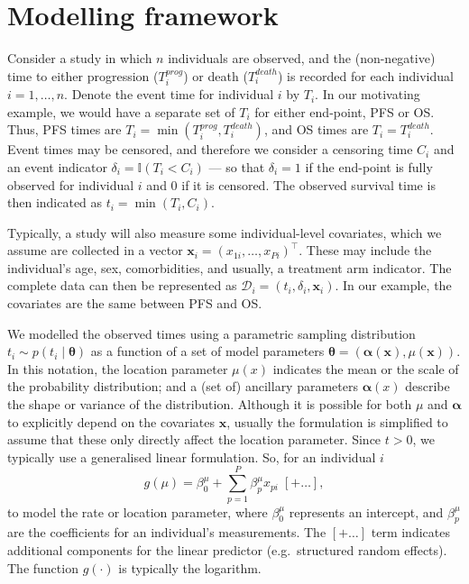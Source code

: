\documentclass[AMA,STIX1COL]{WileyNJD-v2}
\begin{document}
%
\section{Modelling framework}\label{sec:methods}
Consider a study in which $n$ individuals are observed, and the (non-negative) time to either progression ($T^{prog}_{i}$) or death ($T^{death}_{i}$) is recorded for each individual $i=1,\ldots,n$.
Denote the event time for individual $i$ by $T_{i}$.
In our motivating example, we would have a separate set of $T_{i}$ for either end-point, PFS or OS.
Thus, PFS times are $T_{i} = \min(T^{prog}_{i}, T^{death}_{i})$, and OS times are $T_{i} = T^{death}_{i}$.
Event times may be censored, and therefore we consider a censoring time $C_{i}$ and an event indicator $\delta_{i} = \mathbb{I}(T_{i} < C_{i})$
--- so that $\delta_{i} = 1$ if the end-point is fully observed for individual $i$ and 0 if it is censored.
The observed survival time is then indicated as $t_{i} = \min(T_{i}, C_{i})$.

Typically, a study will also measure some individual-level covariates, which we assume are collected in a vector $\bm{x}_{i} = (x_{1i}, \ldots, x_{Pi})^\top$.
These may include the individual's age, sex, comorbidities, and usually, a treatment arm indicator.
The complete data can then be represented as
$\mathcal{D}_i = (t_i, \delta_i, \bm{x}_i)$.
In our example, the covariates are the same between PFS and OS.

We modelled the observed times using a parametric sampling distribution $t_{i} \sim p(t_{i} \mid \bm\theta)$ as a function of a set of model parameters $\bm\theta = (\bm\alpha(\bm x), \mu(\bm x))$. 
In this notation, the location parameter $\mu(x)$ indicates the mean or the scale of the probability distribution; and a (set of) ancillary parameters $\bm \alpha(x)$ describe the shape or variance of the distribution.
Although it is possible for both $\mu$ and $\bm\alpha$ to explicitly depend on the covariates $\bm x$, usually the formulation is simplified to assume that these only directly affect the location parameter.
Since $t>0$, we typically use a generalised linear formulation.
So, for an individual $i$
$$
g(\mu) = \beta^{\mu}_{0} + \sum_{p=1}^P \beta^{\mu}_{p} x_{pi} \; [+ \ldots ],
$$
to model the rate or location parameter,
where $\beta^{\mu}_{0}$ represents an intercept,
and $\beta^{\mu}_{p}$ are the coefficients for an individual's measurements.
The $[+ \ldots]$ term indicates additional components for the linear predictor (e.g.~structured random effects).
The function $g(\cdot)$ is typically the logarithm.
\end{document}
